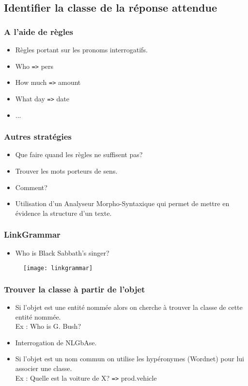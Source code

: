 \documentclass[xcolor=dvipsnames]{beamer}
\begin{document}
\subsection{Identifier la classe de la réponse attendue}
\frame
{
    \frametitle{A l'aide de règles}
    \begin{itemize}
        \item<1-> Règles portant sur les pronoms interrogatifs.
        \item<2-> Who \texttt{=>} pers
        \item<3-> How much \texttt{=>} amount
        \item<4-> What day \texttt{=>} date
        \item<5-> ...
    \end{itemize}
}
\frame
{
    \frametitle{Autres stratégies}
    \begin{itemize}
        \item<1-> Que faire quand les règles ne suffisent pas?
        \item<2-> Trouver les mots porteurs de sens.
        \item<3-> Comment? 
        \item<4-> Utilisation d'un Analyseur Morpho-Syntaxique qui permet de mettre en évidence la structure d'un texte.
    \end{itemize}
}
\frame
{
    \frametitle{LinkGrammar}
    \begin{itemize}
        \item  Who is Black Sabbath's singer?
    \end{itemize}
    \begin{figure}
        \texttt{[image: linkgrammar]}
    \end{figure}
}
\frame
{
    \frametitle{Trouver la classe à partir de l'objet}
    \begin{itemize}
        \item<1-> Si l'objet est une entité nommée alors on cherche à trouver la classe de cette entité nommée. \\
            Ex : Who is G. Bush?
        \item<2-> Interrogation de NLGbAse.
        \item<3-> Si l'objet est un nom commun on utilise les hypéronymes (Wordnet) pour lui associer une classe. \\
            Ex : Quelle est la voiture de X? \texttt{=>} prod.vehicle
    \end{itemize}
}
\end{document}
